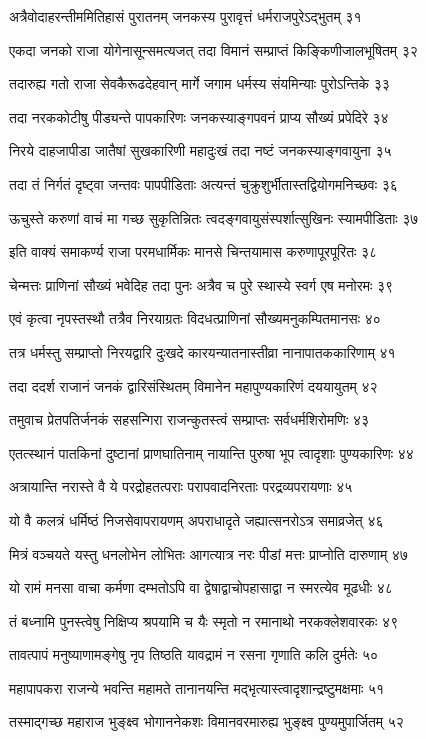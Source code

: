अत्रैवोदाहरन्तीममितिहासं पुरातनम्
जनकस्य पुरावृत्तं धर्मराजपुरेऽद्भुतम् ३१

एकदा जनको राजा योगेनासून्समत्यजत्
तदा विमानं सम्प्राप्तं किङ्किणीजालभूषितम् ३२

तदारुह्य गतो राजा सेवकैरूढदेहवान्
मार्गे जगाम धर्मस्य संयमिन्याः पुरोऽन्तिके ३३

तदा नरककोटीषु पीड्यन्ते पापकारिणः
जनकस्याङ्गपवनं प्राप्य सौख्यं प्रपेदिरे ३४

निरये दाहजापीडा जातैषां सुखकारिणी
महादुःखं तदा नष्टं जनकस्याङ्गवायुना ३५

तदा तं निर्गतं दृष्ट्वा जन्तवः पापपीडिताः
अत्यन्तं चुक्रुशुर्भीतास्तद्वियोगमनिच्छवः ३६

ऊचुस्ते करुणां वाचं मा गच्छ सुकृतिन्नितः
त्वदङ्गवायुसंस्पर्शात्सुखिनः स्यामपीडिताः ३७

इति वाक्यं समाकर्ण्य राजा परमधार्मिकः
मानसे चिन्तयामास करुणापूरपूरितः ३८

चेन्मत्तः प्राणिनां सौख्यं भवेदिह तदा पुनः
अत्रैव च पुरे स्थास्ये स्वर्ग एष मनोरमः ३९

एवं कृत्वा नृपस्तस्थौ तत्रैव निरयाग्रतः
विदधत्प्राणिनां सौख्यमनुकम्पितमानसः ४०

तत्र धर्मस्तु सम्प्राप्तो निरयद्वारि दुःखदे
कारयन्यातनास्तीव्रा नानापातककारिणाम् ४१

तदा ददर्श राजानं जनकं द्वारिसंस्थितम्
विमानेन महापुण्यकारिणं दययायुतम् ४२

तमुवाच प्रेतपतिर्जनकं सहसन्गिरा
राजन्कुतस्त्वं सम्प्राप्तः सर्वधर्मशिरोमणिः ४३

एतत्स्थानं पातकिनां दुष्टानां प्राणघातिनाम्
नायान्ति पुरुषा भूप त्वादृशाः पुण्यकारिणः ४४

अत्रायान्ति नरास्ते वै ये परद्रोहतत्पराः
परापवादनिरताः परद्रव्यपरायणाः ४५

यो वै कलत्रं धर्मिष्ठं निजसेवापरायणम्
अपराधादृते जह्यात्सनरोऽत्र समाव्रजेत् ४६

मित्रं वञ्चयते यस्तु धनलोभेन लोभितः
आगत्यात्र नरः पीडां मत्तः प्राप्नोति दारुणाम् ४७

यो रामं मनसा वाचा कर्मणा दम्भतोऽपि वा
द्वेषाद्वाचोपहासाद्वा न स्मरत्येव मूढधीः ४८

तं बध्नामि पुनस्त्वेषु निक्षिप्य श्रपयामि च
यैः स्मृतो न रमानाथो नरकक्लेशवारकः ४९

तावत्पापं मनुष्याणामङ्गेषु नृप तिष्ठति
यावद्रामं न रसना गृणाति कलि दुर्मतेः ५०

महापापकरा राजन्ये भवन्ति महामते
तानानयन्ति मद्भृत्यास्त्वादृशान्द्रष्टुमक्षमाः ५१

तस्माद्गच्छ महाराज भुङ्क्ष्व भोगाननेकशः
विमानवरमारुह्य भुङ्क्ष्व पुण्यमुपार्जितम् ५२

